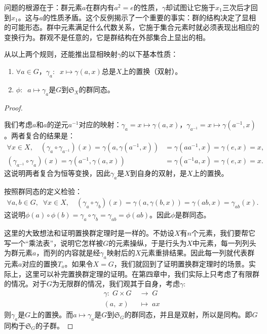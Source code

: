 \documentclass[12pt,UTF8,fontset=none]{ctexbook}
\begin{document}
问题的根源在于：群元素$a$在群内有$a^2=e$的性质，$\gamma$却试图让它施于$x_1$三次后才回到$x_1$。这与$a$的性质矛盾。这个反例揭示了一个重要的事实：群的结构决定了显相的可能形态。群中元素满足什么代数关系，它施于集合元素时就必须表现出相应的变换行为。群观不是任意的，它是群结构在外部集合上显出的相。

从以上两个规则，还能推出显相映射$\gamma$的以下基本性质：
\begin{pp}\label{pp:7-10}
\begin{enumerate}
    \item $\forall a\in G$，$\gamma_a :\;\; x\mapsto\gamma(a,x)$总是$X$上的置换（双射）。
    \item $\phi:\;\;a\mapsto \gamma_a$是$G$到$\mathfrak{S}_X$的群同态。
\end{enumerate}
\end{pp}

\begin{proof}
    \mbox{}\vspace{-12pt}
    \begin{suba}
       \item 我们考虑$a$和$a$的逆元$a^{-1}$对应的映射：$\gamma_a = x\mapsto\gamma(a,x)$，$\gamma_{a^{-1}} = x\mapsto\gamma(a^{-1},x)$。两者复合的结果是：
       \begin{align*}
        \forall x\in X,\quad \left( \gamma_a\circ\gamma_{a^{-1}}\right)(x) = \gamma(a,\gamma(a^{-1},x)) &= \gamma(aa^{-1},x) = \gamma(e,x) = x,\\
        \left(\gamma_{a^{-1}}\circ\gamma_a\right)(x) = \gamma(a^{-1},\gamma(a,x)) &= \gamma(a^{-1}a,x) = \gamma(e,x) = x.
       \end{align*}
       这说明两者复合为恒等变换，因此$\gamma_a$是$X$到自身的双射，是$X$上的置换。
       \item 按照群同态的定义检验：
       \begin{align*}
         \forall a, b\in G, \;\; \forall x\in X,\quad \left(\gamma_a\circ\gamma_b\right)(x) = \gamma(a,\gamma(b,x)) = \gamma(ab, x) = \gamma_{ab}(x).
       \end{align*}
       这说明$\phi(a)\circ\phi(b) = \gamma_a\circ\gamma_b = \gamma_{ab} = \phi(ab)$。因此$\phi$是群同态。
    \end{suba}

    这里的大致想法和证明置换群定理时是一样的。不妨设$X$有$n$个元素，我们要帮它写一个“乘法表”，说明它怎样被$G$的元素操纵，于是行头为$X$中元素，每一列列头为群元素$a$，而列的内容就是经$\gamma_a$映射后的$X$元素重排结果。因此每一列就代表群元素$a$对应的置换$T_a$。如果令$X=G$，我们就回到了证明置换群定理时的场景。实际上，这里可以补完置换群定理的证明。在第四章中，我们实际上只考虑了有限群的情况。对于$G$为无限群的情况，我们观其于自身，考虑$\gamma:$
    \begin{align*}
        \gamma:\; G\times G\;&\longrightarrow \; G\\
        (a, \;x)\;&\longmapsto\; ax
    \end{align*}
    则$\gamma_a$是$G$上的置换。而$a\mapsto \gamma_a$是$G$到$\mathfrak{S}_{G}$的群同态，并且是双射，所以是同构。即$G$同构于$\mathfrak{S}_{G}$的子群。
\end{proof}
\end{document}
